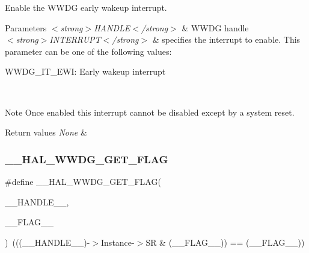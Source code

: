 Enable the W\+W\+DG early wakeup interrupt. 


\begin{DoxyParams}{Parameters}
{\em $<$strong$>$\+H\+A\+N\+D\+L\+E$<$/strong$>$} & W\+W\+DG handle \\
\hline
{\em $<$strong$>$\+I\+N\+T\+E\+R\+R\+U\+P\+T$<$/strong$>$} & specifies the interrupt to enable. This parameter can be one of the following values\+: \begin{DoxyItemize}
\item W\+W\+D\+G\+\_\+\+I\+T\+\_\+\+E\+WI\+: Early wakeup interrupt \end{DoxyItemize}
\\
\hline
\end{DoxyParams}
\begin{DoxyNote}{Note}
Once enabled this interrupt cannot be disabled except by a system reset. 
\end{DoxyNote}

\begin{DoxyRetVals}{Return values}
{\em None} & \\
\hline
\end{DoxyRetVals}
\mbox{\label{group___w_w_d_g___exported___macros_ga60a99447a00a7d95c18637c38147063a}} 
\subsubsection{\texorpdfstring{\+\_\+\+\_\+\+H\+A\+L\+\_\+\+W\+W\+D\+G\+\_\+\+G\+E\+T\+\_\+\+F\+L\+AG}{\_\_HAL\_WWDG\_GET\_FLAG}}
{\footnotesize\ttfamily \#define \+\_\+\+\_\+\+H\+A\+L\+\_\+\+W\+W\+D\+G\+\_\+\+G\+E\+T\+\_\+\+F\+L\+AG(\begin{DoxyParamCaption}\item[{}]{\+\_\+\+\_\+\+H\+A\+N\+D\+L\+E\+\_\+\+\_\+,  }\item[{}]{\+\_\+\+\_\+\+F\+L\+A\+G\+\_\+\+\_\+ }\end{DoxyParamCaption})~(((\+\_\+\+\_\+\+H\+A\+N\+D\+L\+E\+\_\+\+\_\+)-\/$>$Instance-\/$>$SR \& (\+\_\+\+\_\+\+F\+L\+A\+G\+\_\+\+\_\+)) == (\+\_\+\+\_\+\+F\+L\+A\+G\+\_\+\+\_\+))}



